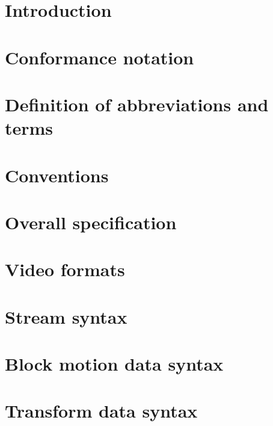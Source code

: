 
\section{Introduction}

\clearpage
\section{Conformance notation}

\clearpage
\section{Definition of abbreviations and terms}

\clearpage
\section{Conventions}

\clearpage
\section{Overall specification}

\clearpage
\section{Video formats}

\clearpage
\section{Stream syntax}

\clearpage
\section{Block motion data syntax}

\clearpage
\section{Transform data syntax}

